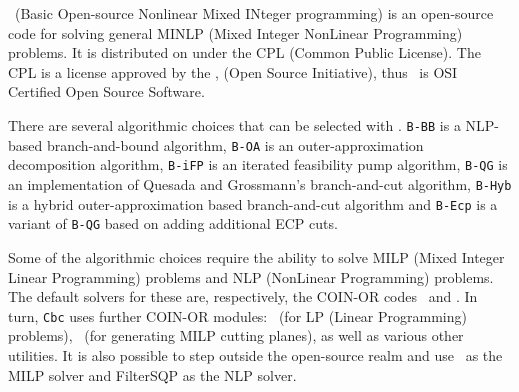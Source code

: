 

\Bonmin\ (Basic Open-source Nonlinear Mixed INteger programming)
is an open-source code for solving general MINLP (Mixed
Integer NonLinear Programming) problems.
 It is distributed on
\COINOR
{}
under the CPL (Common Public
License). The CPL is a license approved by the
,
(Open Source Initiative),
 thus \Bonmin\ is OSI
Certified Open Source Software.

There are several algorithmic choices that can be selected with \Bonmin.
{\tt B-BB} is a NLP-based branch-and-bound algorithm,
{\tt B-OA} is an
outer-ap\-prox\-i\-ma\-tion decomposition algorithm, {\tt B-iFP} is an iterated
feasibility pump algorithm, {\tt B-QG} is an
implementation of  Quesada and Grossmann's branch-and-cut algorithm,
{\tt B-Hyb} is a hybrid outer-ap\-prox\-i\-ma\-tion based
branch-and-cut algorithm and {\tt B-Ecp} is a variant of {\tt B-QG} based
on adding additional ECP cuts.


Some of the algorithmic choices require the ability to solve MILP
(Mixed Integer Linear Programming) problems and NLP (NonLinear
Programming) problems. The default solvers for these are,
respectively, the COIN-OR codes \Cbc\ and \Ipopt. In turn,
{\tt Cbc} uses further COIN-OR modules: \Clp\ (for LP (Linear
Programming) problems), \Cgl\ (for generating MILP cutting
planes), as well as various other utilities. It is also possible to
step outside the open-source realm and use
\Cplex\ as the MILP solver and FilterSQP as the NLP solver. 

